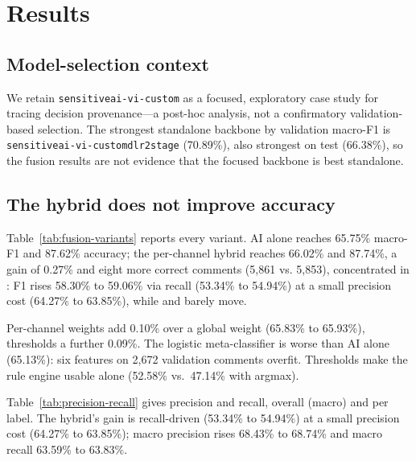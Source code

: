 \section{Results}

\label{sec:results}

\subsection{Model-selection context}

We retain \texttt{sensitiveai-vi-custom} as a focused, exploratory case study for
tracing decision provenance---a post-hoc analysis, not a confirmatory validation-based
selection. The strongest standalone backbone by validation macro-F1 is
\texttt{sensitiveai-vi-customdlr2stage} (70.89\%), also strongest on test (66.38\%), so
the fusion results are not evidence that the focused backbone is best standalone.

\subsection{The hybrid does not improve accuracy}

\label{sec:no-accuracy-gain}

Table~\ref{tab:fusion-variants} reports every variant. AI alone reaches 65.75\%
macro-F1 and 87.62\% accuracy; the per-channel hybrid reaches 66.02\% and 87.74\%, a gain
of 0.27\% and eight more correct comments (5{,}861 vs. 5{,}853), concentrated in
\hate{}: F1 rises 58.30\% to 59.06\% via recall (53.34\% to 54.94\%) at a small precision
cost (64.27\% to 63.85\%), while \off{} and \clean{} barely move.

Per-channel weights add 0.10\% over a global weight (65.83\% to 65.93\%), thresholds
a further 0.09\%. The logistic meta-classifier is worse than AI alone (65.13\%): six
features on 2{,}672 validation comments overfit. Thresholds make the rule engine
usable alone (52.58\% vs.\ 47.14\% with argmax).



Table~\ref{tab:precision-recall} gives precision and recall, overall (macro) and
per label. The hybrid's \hate{} gain is recall-driven (53.34\% to 54.94\%) at a small
precision cost (64.27\% to 63.85\%); macro precision rises 68.43\% to 68.74\% and macro
recall 63.59\% to 63.83\%.

\vspace{12pt}


